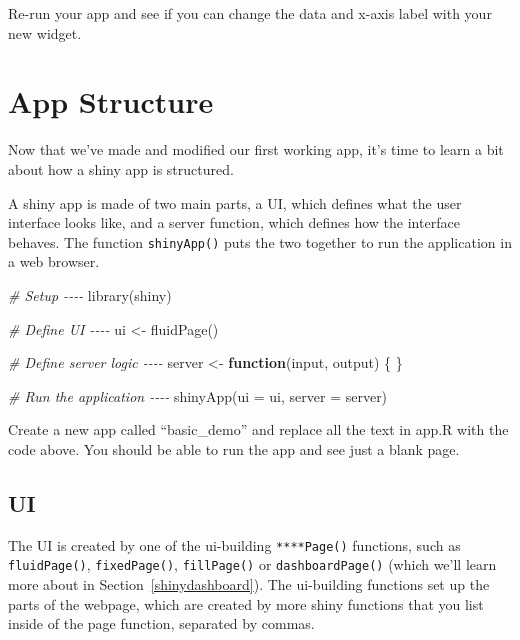\documentclass[
  oneside]{book}
\newenvironment{Shaded}{\begin{snugshade}}{\end{snugshade}}
\newcommand{\AttributeTok}[1]{\textcolor[rgb]{0.77,0.63,0.00}{#1}}
\newcommand{\CommentTok}[1]{\textcolor[rgb]{0.56,0.35,0.01}{\textit{#1}}}
\newcommand{\ControlFlowTok}[1]{\textcolor[rgb]{0.13,0.29,0.53}{\textbf{#1}}}
\newcommand{\FunctionTok}[1]{\textcolor[rgb]{0.00,0.00,0.00}{#1}}
\newcommand{\NormalTok}[1]{#1}
\newcommand{\OtherTok}[1]{\textcolor[rgb]{0.56,0.35,0.01}{#1}}
\begin{document}
Re-run your app and see if you can change the data and x-axis label with your new widget.

\hypertarget{app-structure}{%
\section{App Structure}\label{app-structure}}

Now that we've made and modified our first working app, it's time to learn a bit about how a shiny app is structured.

A shiny app is made of two main parts, a UI, which defines what the user interface looks like, and a server function, which defines how the interface behaves. The function \texttt{shinyApp}\texttt{()} puts the two together to run the application in a web browser.

\begin{Shaded}
\begin{Highlighting}[]
\CommentTok{\# Setup {-}{-}{-}{-}}
\FunctionTok{library}\NormalTok{(shiny)}

\CommentTok{\# Define UI {-}{-}{-}{-}}
\NormalTok{ui }\OtherTok{\textless{}{-}} \FunctionTok{fluidPage}\NormalTok{()}

\CommentTok{\# Define server logic {-}{-}{-}{-}}
\NormalTok{server }\OtherTok{\textless{}{-}} \ControlFlowTok{function}\NormalTok{(input, output) \{}
\NormalTok{\}}

\CommentTok{\# Run the application {-}{-}{-}{-}}
\FunctionTok{shinyApp}\NormalTok{(}\AttributeTok{ui =}\NormalTok{ ui, }\AttributeTok{server =}\NormalTok{ server)}
\end{Highlighting}
\end{Shaded}

\begin{try}
Create a new app called ``basic\_demo'' and replace all the text in app.R with the code above. You should be able to run the app and see just a blank page.

\end{try}

\hypertarget{ui}{%
\subsection{UI}\label{ui}}

The UI is created by one of the ui-building \texttt{****Page()} functions, such as \texttt{fluidPage}\texttt{()}, \texttt{fixedPage}\texttt{()}, \texttt{fillPage}\texttt{()} or \texttt{dashboardPage}\texttt{()} (which we'll learn more about in Section~\ref{shinydashboard}). The ui-building functions set up the parts of the webpage, which are created by more shiny functions that you list inside of the page function, separated by commas.
\end{document}
